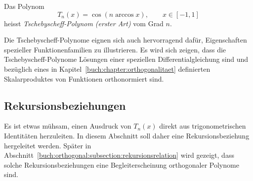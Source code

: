 \begin{definition}
%
\label{buch:potenzen:def:tschebyscheff}
Das Polynom
\[
T_n(x)
=
\cos (n\arccos x),
\qquad
x\in[-1,1]
\]
heisst
{\em Tschebyscheff-Polynom (erster Art)} vom Grad $n$.
\end{definition}
Die Tschebyscheff-Polynome eignen sich auch hervorragend
dafür, Eigenschaften spezieller Funktionenfamilien zu
illustrieren.
Es wird sich zeigen, dass die Tschebyscheff-Polynome
Lösungen einer speziellen Differentialgleichung sind und
bezüglich eines in Kapitel~\ref{buch:chapter:orthogonalitaet}
definierten Skalarproduktes von Funktionen orthonormiert sind.

\subsection{Rekursionsbeziehungen
\label{buch:potenzen:tschebyscheff:rekursionsbeziehungen}}
Es ist etwas mühsam, einen Ausdruck von $T_n(x)$ direkt aus
trigonometrischen Identitäten herzuleiten.
In diesem Abschnitt soll daher eine Rekursionsbeziehung
hergeleitet werden.
Später in Abschnitt~\ref{buch:orthogonal:subsection:rekursionsrelation}
wird gezeigt, dass solche Rekursionsbeziehungen eine Begleiterscheinung
orthogonaler Polynome sind.

